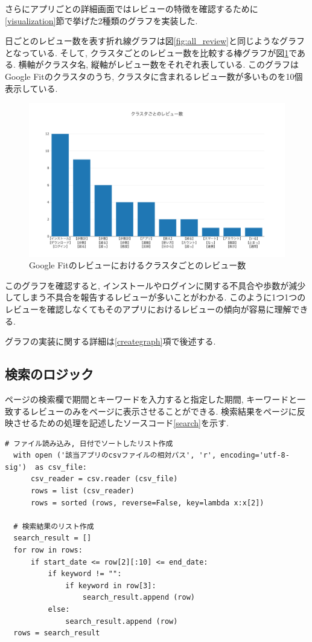 さらにアプリごとの詳細画面ではレビューの特徴を確認するために\ref{visualization}節で挙げた2種類のグラフを実装した.

日ごとのレビュー数を表す折れ線グラフは図\ref{fig:all_review}と同じようなグラフとなっている. 
そして, クラスタごとのレビュー数を比較する棒グラフが図\ref{fig:top10}である. 横軸がクラスタ名, 縦軸がレビュー数をそれぞれ表している. 
このグラフはGoogle Fitのクラスタのうち, クラスタに含まれるレビュー数が多いものを10個表示している. 

\begin{figure}[H]
  \centering
  \includegraphics[scale=0.4]
    {contents/images/top10.png}
  \caption{Google Fitのレビューにおけるクラスタごとのレビュー数\label{fig:top10}}
\end{figure}

このグラフを確認すると, インストールやログインに関する不具合や歩数が減少してしまう不具合を報告するレビューが多いことがわかる. このように1つ1つのレビューを確認しなくてもそのアプリにおけるレビューの傾向が容易に理解できる. 

グラフの実装に関する詳細は\ref{creategraph}項で後述する. 

\subsection{検索のロジック}
ページの検索欄で期間とキーワードを入力すると指定した期間, キーワードと一致するレビューのみをページに表示させることができる. 
検索結果をページに反映させるための処理を記述したソースコード\ref{search}を示す. 

\begin{lstlisting}[caption=検索機能, label=search]
  # ファイル読み込み, 日付でソートしたリスト作成
  with open ('該当アプリのcsvファイルの相対パス', 'r', encoding='utf-8-sig')  as csv_file:
      csv_reader = csv.reader (csv_file) 
      rows = list (csv_reader) 
      rows = sorted (rows, reverse=False, key=lambda x:x[2]) 

  # 検索結果のリスト作成
  search_result = []
  for row in rows:
      if start_date <= row[2][:10] <= end_date:
          if keyword != "":
              if keyword in row[3]:
                  search_result.append (row) 
          else:
              search_result.append (row) 
  rows = search_result
\end{lstlisting}


